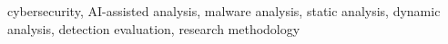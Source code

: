 \begin{IEEEkeywords}
cybersecurity, AI-assisted analysis, malware analysis, static analysis, dynamic analysis, detection evaluation, research methodology
\end{IEEEkeywords}
